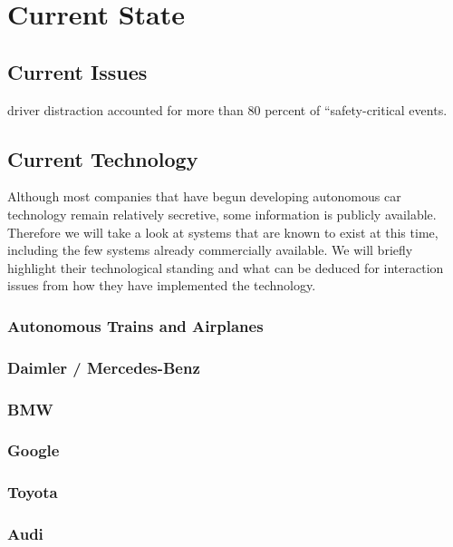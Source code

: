 \documentclass{acm_proc_article-sp}
\begin{document}
\section{Current State}

\subsection{Current Issues}

driver distraction accounted for more than 80 percent of “safety-critical events.

\subsection{Current Technology}

Although most companies that have begun developing autonomous car technology remain relatively secretive, some information is publicly available.
Therefore we will take a look at systems that are known to exist at this time, including the few systems already commercially available.
We will briefly highlight their technological standing and what can be deduced for interaction issues from how they have implemented the technology.

\subsubsection{Autonomous Trains and Airplanes}

\subsubsection{Daimler / Mercedes-Benz}

\subsubsection{BMW}

\subsubsection{Google}

\subsubsection{Toyota}

\subsubsection{Audi}
\end{document}
